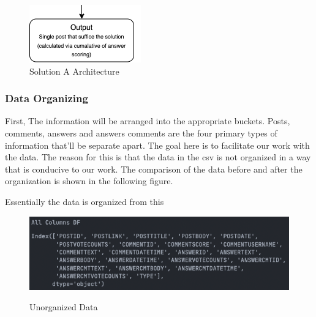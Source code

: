 \begin{figure}[H] 
  \centering
  \noindent \includegraphics[scale=1]{slice_solution-a_3.png}

\caption{Solution A Architecture}\label{solution_a_architecture}
\end{figure}

\subsubsection{Data Organizing} \label{data-organization}
First, The information will be arranged into the appropriate buckets. Posts, comments, answers and answers comments are the four primary types of information that'll be separate apart. The goal here is to facilitate our work with the data. The reason for this is that the data in the csv is not organized in a way that is conducive to our work. The comparison of the data before and after the organization is shown in the following figure.

\noindent Essentially the data is organized from this

\begin{figure}[H]
  \noindent \includegraphics[scale=0.65]{all_columns_df.png}\\
  \caption{Unorganized Data}
  \label{unorgainzed_data }
\end{figure}

